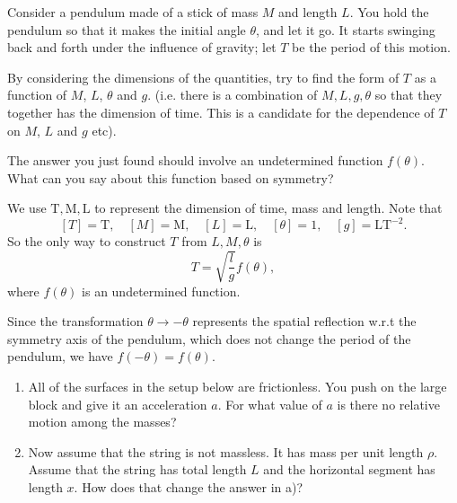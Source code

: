 \documentclass{article}
\begin{document}
\begin{problem}
Consider a pendulum made of a stick of mass $M$ and length $L$. You hold the pendulum so that it makes the initial angle $\theta$, and let it go. It starts swinging back and forth under the influence of gravity; let $T$ be the period of this motion.

By considering the dimensions of the quantities, try to find the form of $T$ as a function of $M$, $L$, $\theta$ and $g$. (i.e. there is a combination of $M,L,g,\theta$ so that they together has the dimension of time. This is a candidate for the dependence of $T$ on $M$, $L$ and $g$ etc).

The answer you just found should involve an undetermined function $f(\theta)$. What can you say about this function based on symmetry?
\end{problem}

\begin{solution}
	We use $\mathrm{T,M,L}$ to represent the dimension of time, mass and length. Note that
	\[ [T] = \mathrm{T}, \quad [M] = \mathrm{M}, \quad [L] = \mathrm{L}, \quad [\theta] = 1, \quad [g] = \mathrm{LT^{-2}}. \]
	So the only way to construct $T$ from $L,M,\theta$ is
	\[ T = \sqrt{\frac{l}{g}}f(\theta), \]
	where $f(\theta)$ is an undetermined function.

	Since the transformation $\theta \to -\theta$ represents the spatial reflection w.r.t the symmetry axis of the pendulum, which does not change the period of the pendulum, we have $f(-\theta) = f(\theta)$.
\end{solution}



\begin{problem}
\begin{enumerate}
  \item[a)] All of the surfaces in the setup below are frictionless. You push on the large block and give it an acceleration $a$. For what value of $a$ is there no relative motion among the masses?

  \begin{center}
  \end{center}

  \item[b)] Now assume that the string is not massless. It has mass per unit length $\rho$. Assume that the string has total length $L$ and the horizontal segment has length $x$. How does that change the answer in a)?
\end{enumerate}
\end{problem}
\end{document}
